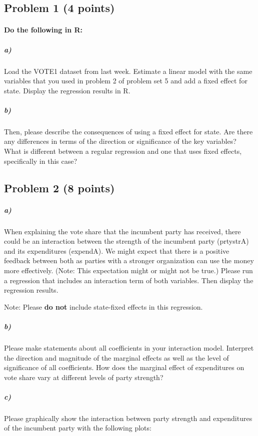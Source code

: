 \documentclass[12pt]{article}
\begin{document}
\subsection*{Problem 1 (4 points)}

\paragraph{Do the following in R:}

\subparagraph{a)} Load the VOTE1 dataset from last week. Estimate a linear model with the same variables that you used in problem 2 of problem set 5 and add a fixed effect for state. Display the regression results in R.

\subparagraph{b)} Then, please describe the consequences of using a fixed effect for state. Are there any differences in terms of the direction or significance of the key variables? What is different between a regular regression and one that uses fixed effects, specifically in this case?



\subsection*{Problem 2 (8 points)}

\subparagraph{a)} When explaining the vote share that the incumbent party has received, there could be an interaction between the strength of the incumbent party (prtystrA) and its expenditures (expendA). We might expect that there is a positive feedback between both as parties with a stronger organization can use the money more effectively. (Note: This expectation might or might not be true.) Please run a regression that includes an interaction term of both variables. Then display the regression results.

Note: Please \textbf{do not} include state-fixed effects in this regression.

\subparagraph{b)} Please make statements about all coefficients in your interaction model. Interpret the direction and magnitude of the marginal effects as well as the level of significance of all coefficients. How does the marginal effect of expenditures on vote share vary at different levels of party strength?

\subparagraph{c)} Please graphically show the interaction between party strength and expenditures of the incumbent party with the following plots:
\end{document}

